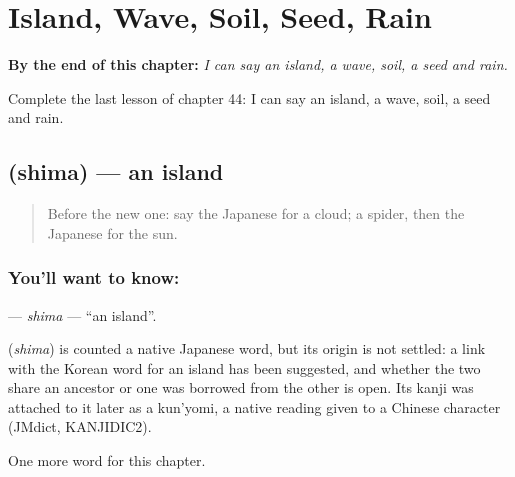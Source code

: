 
\chapter{Island, Wave, Soil, Seed, Rain}
\label{ch:ja-island-wave-soil-seed-rain}

\begin{chapteropening}
\textbf{By the end of this chapter:} \emph{I can say an island, a wave, soil, a seed and rain.}

Complete the last lesson of chapter 44: I can say an island, a wave, soil, a seed and rain.
\end{chapteropening}

\section[\texorpdfstring{\ja{しま} (shima)}{しま (shima)}]{ (shima) — an island}

\label{lesson:JA-C44-shima}



\begin{quote}
Before the new one: say the Japanese for a cloud; a spider, then the Japanese for the sun.
\end{quote}

\subsection*{You'll want to know: }
\textbf{} — \emph{shima} — \textquotedblleft{}an island\textquotedblright{}.

\begin{cousinweb}
\textbf{} (\emph{shima}) is counted a native Japanese word, but its origin is not settled: a link with the Korean word for an island has been suggested, and whether the two share an ancestor or one was borrowed from the other is open. Its kanji was attached to it later as a kun'yomi, a native reading given to a Chinese character (JMdict, KANJIDIC2).
\end{cousinweb}

\begin{grammarlens}[title={What you've built}]
One more word for this chapter.
\end{grammarlens}

